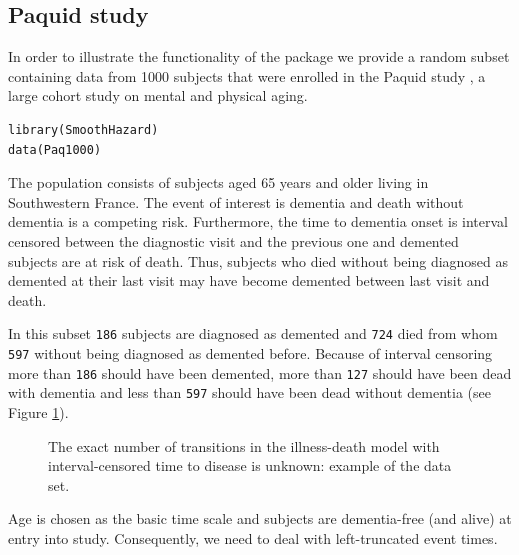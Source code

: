 \documentclass[article]{jss}
\begin{document}
\subsection{Paquid study}
\label{sec-5-2}
In order to illustrate the functionality of the package we provide a
random subset containing data from 1000 subjects that were enrolled in
the Paquid study \citep{letenneur1999sex}, a large cohort study on
mental and physical aging.
\lstset{language=R,numbers=none}
\begin{lstlisting}
library(SmoothHazard)
data(Paq1000)
\end{lstlisting}
The population consists of subjects aged 65 years and older living in
Southwestern France. 
The event of interest is dementia and death without
dementia is a competing risk. Furthermore, the time to dementia onset
is interval censored between the diagnostic visit and the previous one 
and demented subjects are at risk of death.
Thus, subjects who died without being diagnosed as demented at their last visit 
may have become demented between last visit and death.

In this subset \texttt{186} subjects are diagnosed as demented
and \texttt{724} died from whom \texttt{597} without
being diagnosed as demented before. Because of interval censoring 
more than \texttt{186} should have been demented, more than
\texttt{127} should have been dead with dementia and
less than \texttt{597} should have been dead without dementia
(see Figure \ref{fig:2}).
\begin{center}
\begin{figure}
\centering
{}
\caption{The exact number of transitions in the illness-death model with interval-censored time to disease is unknown: example of the  data set.}
\label{fig:2}
\end{figure}
\end{center}

Age is chosen as the basic time scale and subjects are dementia-free
(and alive) at entry into study.  Consequently, we need to deal with
left-truncated event times.
\end{document}
